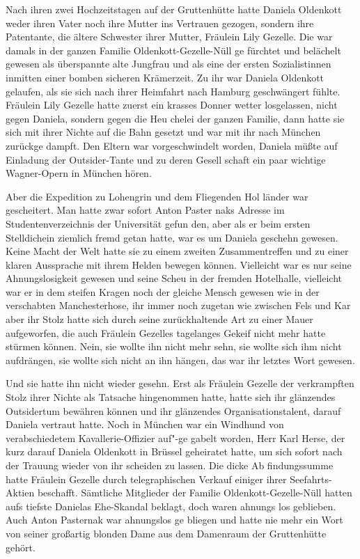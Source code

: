 Nach ihren zwei Hochzeitstagen auf der Gruttenhütte hatte
Daniela Oldenkott weder ihren Vater noch ihre Mutter ins
Vertrauen gezogen, sondern ihre Patentante, die ältere
Schwester ihrer Mutter, Fräulein Lily Gezelle. Die war
damals in der ganzen Familie Oldenkott-Gezelle-Nüll ge\-%
fürchtet und belächelt gewesen als überspannte alte Jungfrau
und als eine der ersten Sozialistinnen inmitten einer bomben\-%
sicheren Krämerzeit. Zu ihr war Daniela Oldenkott gelaufen,
als sie sich nach ihrer Heimfahrt nach Hamburg geschwängert
fühlte. Fräulein Lily Gezelle hatte zuerst ein krasses Donner\-%
wetter losgelassen, nicht gegen Daniela, sondern gegen die Heu\-%
chelei der ganzen Familie, dann hatte sie sich mit ihrer Nichte
auf die Bahn gesetzt und war mit ihr nach München zurückge\-%
dampft. Den Eltern war vorgeschwindelt worden, Daniela
müßte auf Einladung der Outsider-Tante und zu deren Gesell\-%
schaft ein paar wichtige Wagner-Opern in München hören.

Aber die Expedition zu Lohengrin und dem Fliegenden Hol\-%
länder war gescheitert. Man hatte zwar sofort Anton Paster\-%
naks Adresse im Studentenverzeichnis der Universität gefun\-%
den, aber als er beim ersten Stelldichein ziemlich fremd getan
hatte, war es um Daniela geschehn gewesen. Keine Macht der
Welt hatte sie zu einem zweiten Zusammentreffen und zu
einer klaren Aussprache mit ihrem Helden bewegen können.
Vielleicht war es nur seine Ahnungslosigkeit gewesen und seine
Scheu in der fremden Hotelhalle, vielleicht war er in dem
steifen Kragen noch der gleiche Mensch gewesen wie in der
verschabten Manchesterhose, ihr immer noch zugetan wie
zwischen Fels und Kar\dopp{} aber ihr Stolz hatte sich durch seine
zurückhaltende Art zu einer Mauer aufgeworfen, die auch
Fräulein Gezelles tagelanges Gekeif nicht mehr hatte stürmen
können. Nein, sie wollte ihn nicht mehr sehn, sie wollte sich
ihm nicht aufdrängen, sie wollte sich nicht an ihn hängen,
das war ihr letztes Wort gewesen.

Und sie hatte ihn nicht wieder gesehn. Erst als Fräulein
Gezelle der verkrampften Stolz ihrer Nichte als Tatsache
hingenommen hatte, hatte sich ihr glänzendes Outsidertum
bewähren können und ihr glänzendes Organisationstalent,
darauf Daniela vertraut hatte. Noch in München war ein
Windhund von verabschiedetem Kavallerie-Offizier auf"-ge\-%
gabelt worden, Herr Karl Herse, der kurz darauf Daniela
Oldenkott in Brüssel geheiratet hatte, um sich sofort nach der
Trauung wieder von ihr scheiden zu lassen. Die dicke Ab\-%
findungssumme hatte Fräulein Gezelle durch telegraphischen
Verkauf einiger ihrer Seefahrts-Aktien beschafft. Sämtliche
Mitglieder der Familie Oldenkott-Gezelle-Nüll hatten aufs
tiefste Danielas Ehe-Skandal beklagt, doch waren ahnungs\-%
los geblieben. Auch Anton Pasternak war ahnungslos ge\-%
bliegen und hatte nie mehr ein Wort von seiner großartig
blonden Dame aus dem Damenraum der Gruttenhütte
gehört.

